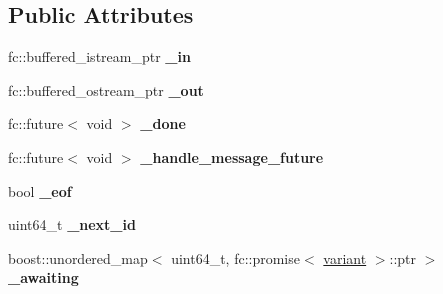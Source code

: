 \subsection*{Public Attributes}
\begin{DoxyCompactItemize}
\item 
\mbox{\label{classfc_1_1rpc_1_1detail_1_1json__connection__impl_aa971d0c24a72e023df8a0db1831d72bd}} 
fc\+::buffered\+\_\+istream\+\_\+ptr {\bfseries \+\_\+in}
\item 
\mbox{\label{classfc_1_1rpc_1_1detail_1_1json__connection__impl_a930a4f839d382f425ba943f250b1e5b6}} 
fc\+::buffered\+\_\+ostream\+\_\+ptr {\bfseries \+\_\+out}
\item 
\mbox{\label{classfc_1_1rpc_1_1detail_1_1json__connection__impl_aa19f4779f0b7764fa63c236e698a6669}} 
fc\+::future$<$ void $>$ {\bfseries \+\_\+done}
\item 
\mbox{\label{classfc_1_1rpc_1_1detail_1_1json__connection__impl_ad12da2e1d6c5706924fcecf3bdf0a1a2}} 
fc\+::future$<$ void $>$ {\bfseries \+\_\+handle\+\_\+message\+\_\+future}
\item 
\mbox{\label{classfc_1_1rpc_1_1detail_1_1json__connection__impl_a4906b6ad1c904b3582b0104295f254f7}} 
bool {\bfseries \+\_\+eof}
\item 
\mbox{\label{classfc_1_1rpc_1_1detail_1_1json__connection__impl_a1b5092e3a6d7ee83f5e7ed8ee79b0519}} 
uint64\+\_\+t {\bfseries \+\_\+next\+\_\+id}
\item 
\mbox{\label{classfc_1_1rpc_1_1detail_1_1json__connection__impl_a345758c353864c90d5cb87a374990b25}} 
boost\+::unordered\+\_\+map$<$ uint64\+\_\+t, fc\+::promise$<$ \mbox{\hyperlink{classfc_1_1variant}{variant}} $>$\+::ptr $>$ {\bfseries \+\_\+awaiting}
\item 
\mbox{\label{classfc_1_1rpc_1_1detail_1_1json__connection__impl_aff53a7247198fd5eb9eab7717eb205f4}} 

\end{DoxyCompactItemize}
